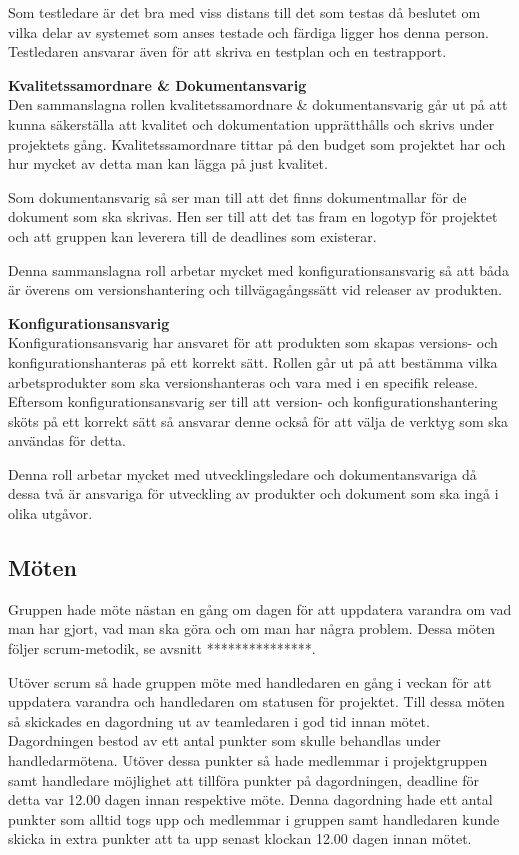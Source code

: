 Som testledare är det bra med viss distans till det som testas då beslutet om vilka delar av systemet som anses testade och färdiga ligger hos denna person. Testledaren ansvarar även för att skriva en testplan och en testrapport.

\textbf{Kvalitetssamordnare \& Dokumentansvarig}\\
Den sammanslagna rollen kvalitetssamordnare \& dokumentansvarig går ut på att kunna säkerställa att kvalitet och dokumentation upprätthålls och skrivs under projektets gång. Kvalitetssamordnare tittar på den budget som projektet har och hur mycket av detta man kan lägga på just kvalitet.

Som dokumentansvarig så ser man till att det finns dokumentmallar för de dokument som ska skrivas. Hen ser till att det tas fram en logotyp för projektet och att gruppen kan leverera till de deadlines som existerar.

Denna sammanslagna roll arbetar mycket med konfigurationsansvarig så att båda är överens om versionshantering och tillvägagångssätt vid releaser av produkten.

\textbf{Konfigurationsansvarig}
\\Konfigurationsansvarig har ansvaret för att produkten som skapas versions- och konfigurationshanteras på ett korrekt sätt. Rollen går ut på att bestämma vilka arbetsprodukter som ska versionshanteras och vara med i en specifik release. Eftersom konfigurationsansvarig ser till att version- och konfigurationshantering sköts på ett korrekt sätt så ansvarar denne också för att välja de verktyg som ska användas för detta.

Denna roll arbetar mycket med utvecklingsledare och dokumentansvariga då dessa två är ansvariga för utveckling av produkter och dokument som ska ingå i olika utgåvor.

\subsection{Möten}
Gruppen hade möte nästan en gång om dagen för att uppdatera varandra om vad man har gjort, vad man ska göra och om man har några problem. Dessa möten följer scrum-metodik, se avsnitt ***************.

Utöver scrum så hade gruppen möte med handledaren en gång i veckan för att uppdatera varandra och handledaren om statusen för projektet. Till dessa möten så skickades en dagordning ut av teamledaren i god tid innan mötet. Dagordningen bestod av ett antal punkter som skulle behandlas under handledarmötena. Utöver dessa punkter så hade medlemmar i projektgruppen samt handledare möjlighet att tillföra punkter på dagordningen, deadline för detta var 12.00 dagen innan respektive möte. 
Denna dagordning hade ett antal punkter som alltid togs upp och medlemmar i gruppen samt handledaren kunde skicka in extra punkter att ta upp senast klockan 12.00 dagen innan mötet.

